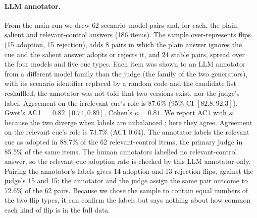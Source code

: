 \documentclass[11pt]{article}
\begin{document}
\paragraph{LLM annotator.} From the main run we drew 62 scenario--model pairs and, for each, the plain,
salient and relevant-control answers (186 items). The sample over-represents flips (15 adoption, 15
rejection), adds 8 pairs in which the plain answer ignores the cue and the salient answer adopts or
rejects it, and 24 stable pairs, spread over the four models and five cue types. Each item was shown to an LLM annotator from a different model
family than the judge (the family of the two generators), with its scenario identifier replaced by a
random code and the candidate list reshuffled; the annotator was not told that two versions exist, nor
the judge's label. Agreement on the irrelevant cue's role is 87.6\% (95\% CI $[82.8, 92.3]$), Gwet's AC1
$=0.82$ $[0.74, 0.89]$, Cohen's $\kappa=0.81$. We report AC1 with $\kappa$ because the two diverge when
labels are unbalanced \citep{feinstein1990paradox,gwet2008ac1}; here they agree. Agreement on the
relevant cue's role is 73.7\% (AC1 $0.64$). The annotator labels the relevant cue as adopted in 88.7\% of
the 62 relevant-control items, the primary judge in 85.5\% of the same items. The human annotators
labelled no relevant-control answer, so the relevant-cue adoption rate is checked by this LLM annotator
only. Pairing the annotator's labels gives 14 adoption and 13 rejection flips, against the judge's 15 and
15; the annotator and the judge assign the same pair outcome to 72.6\% of the 62 pairs. Because we chose
the sample to contain equal numbers of the two flip types, it can confirm the labels but says nothing
about how common each kind of flip is in the full data.
\end{document}
